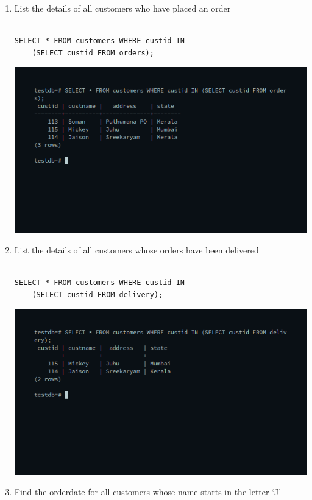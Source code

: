 \begin{enumerate}
\item List the details of all customers who have placed an order\newline
\begin{verbatim}

SELECT * FROM customers WHERE custid IN 
	(SELECT custid FROM orders);

\end{verbatim}
\newline
\includegraphics[width=\linewidth]{../Images/Joins/1.png}
\item List the details of all customers whose orders have been delivered\newline
\begin{verbatim}

SELECT * FROM customers WHERE custid IN 
	(SELECT custid FROM delivery);

\end{verbatim}
\newline
\includegraphics[width=\linewidth]{../Images/Joins/2.png}
\item Find the orderdate for all customers whose name starts in the letter ‘J’\newline
\begin{verbatim}


\end{verbatim}
\end{enumerate}

